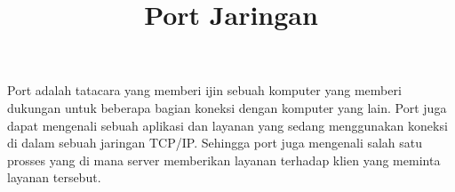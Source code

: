 \documentclass[a4paper, 12pt, times new roman]{article}
\title{Port Jaringan}
\begin{document}
	Port adalah tatacara yang memberi ijin sebuah komputer yang memberi dukungan untuk beberapa bagian koneksi dengan komputer yang lain. Port juga dapat mengenali sebuah aplikasi dan layanan yang sedang menggunakan koneksi di dalam sebuah jaringan TCP/IP. Sehingga port juga mengenali salah satu prosses yang di mana server memberikan layanan terhadap klien yang meminta layanan tersebut.
\end{document}
